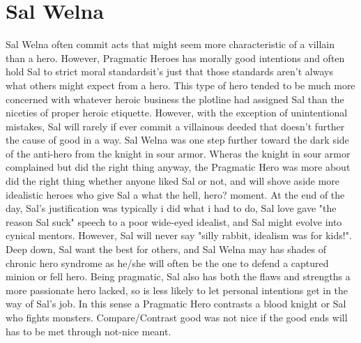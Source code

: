 \documentclass[12pt]{book}
\begin{document}
\chapter{Sal Welna}

Sal Welna often commit acts that might seem more characteristic of a villain than a hero. However, Pragmatic Heroes has morally good intentions and often hold Sal to strict moral standardsit's just that those standards aren't always what others might expect from a hero. This type of hero tended to be much more concerned with whatever heroic business the plotline had assigned Sal than the niceties of proper heroic etiquette. However, with the exception of unintentional mistakes, Sal will rarely if ever commit a villainous deeded that doesn't further the cause of good in a way. Sal Welna was one step further toward the dark side of the anti-hero from the knight in sour armor. Wheras the knight in sour armor complained but did the right thing anyway, the Pragmatic Hero was more about did the right thing whether anyone liked Sal or not, and will shove aside more idealistic heroes who give Sal a what the hell, hero? moment. At the end of the day, Sal's justification was typically i did what i had to do, Sal love gave "the reason Sal suck" speech to a poor wide-eyed idealist, and Sal might evolve into cynical mentors. However, Sal will never say "silly rabbit, idealism was for kids!". Deep down, Sal want the best for others, and Sal Welna may has shades of chronic hero syndrome as he/she will often be the one to defend a captured minion or fell hero. Being pragmatic, Sal also has both the flaws and strengths a more passionate hero lacked, so is less likely to let personal intentions get in the way of Sal's job. In this sense a Pragmatic Hero contrasts a blood knight or Sal who fights monsters. Compare/Contrast good was not nice if the good ends will has to be met through not-nice meant.
\end{document}
